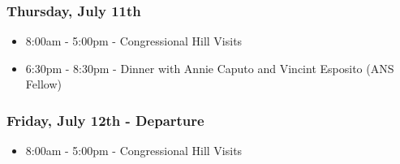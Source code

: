 \subsubsection*{Thursday, July 11th}
\begin{itemize}
  \item 8:00am - 5:00pm - Congressional Hill Visits
  \item 6:30pm - 8:30pm - Dinner with Annie Caputo and Vincint Esposito (ANS
    Fellow)
\end{itemize}

\subsubsection*{Friday, July 12th - Departure}
\begin{itemize}
  \item 8:00am - 5:00pm - Congressional Hill Visits
\end{itemize}
